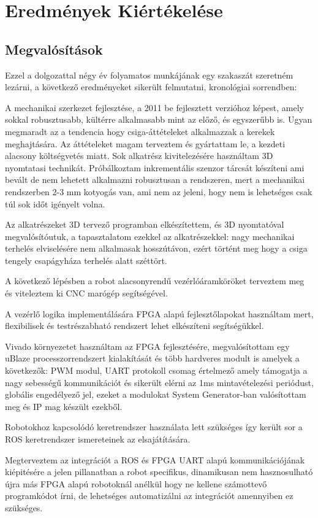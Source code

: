 \chapter{Eredmények Kiértékelése}
\section{Megvalósítások}
Ezzel a dolgozattal négy év folyamatos munkájának egy szakaszát szeretném lezárni, a következő eredményeket sikerült felmutatni, kronológiai sorrendben: 

A mechanikai szerkezet fejlesztése, a 2011 be fejlesztett verzióhoz képest, amely sokkal robusztusabb, kültérre alkalmasabb mint az előző, és egyszerűbb is. Ugyan megmaradt az a tendencia hogy csiga-áttételeket alkalmazzak a kerekek meghajtására. Az áttételeket magam terveztem és gyártattam le, a kezdeti alacsony költségvetés miatt. 
Sok alkatrész kivitelezésére használtam 3D nyomtatasi technikát. Próbálkoztam inkrementális szenzor tárcsát készíteni ami bevált de nem lehetett alkalmazni robusztusan a rendszeren, mert a mechanikai rendszerben 2-3 mm kotyogás van, ami nem az jeleni, hogy nem is lehetséges csak túl sok időt igényelt volna.

Az alkatrészeket 3D tervező programban elkészítettem, és 3D nyomtatóval megvalósítóutuk, a tapasztalatom ezekkel az alkatrészekkel: nagy mechanikai terhelés elviselésére nem alkalmasak hosszútávon, ezért történt meg hogy a csiga tengely csapágyháza terhelés alatt széttört.

A következő lépésben a robot alacsonyrendű vezérlóáramköröket terveztem meg és viteleztem ki CNC marógép segítségével.

A vezérlő logika implementálására FPGA alapú fejlesztőlapokat használtam mert, flexibilisek és testrészabható rendszert lehet elkészíteni segítségükkel.

Vivado környezetet használtam az FPGA fejlesztésére, megvalósítottam egy uBlaze processzorrendszert kialakítását és több hardveres modult is amelyek a következők: PWM modul, UART protokoll csomag értelmező amely támogatja a nagy sebességű kommunikációt és sikerült elérni  az 1ms mintavételezési periódust, globális engedélyező jel, ezeket a modulokat System Generator-ban valósítottam meg és IP mag készült ezekből.

Robotokhoz kapcsolódó keretrendszer használata lett szükséges így került sor a ROS keretrendszer ismereteinek az elsajátítására.

Megterveztem az integrációt a ROS és FPGA UART alapú kommunikációjának kiépitésére a jelen pillanatban a robot specifikus, dinamikusan nem hasznosulható újra más FPGA alapú robotoknál anélkül hogy ne kellene számottevő programkódot írni, de lehetséges automatizálni az integrációt amennyiben ez szükséges.

